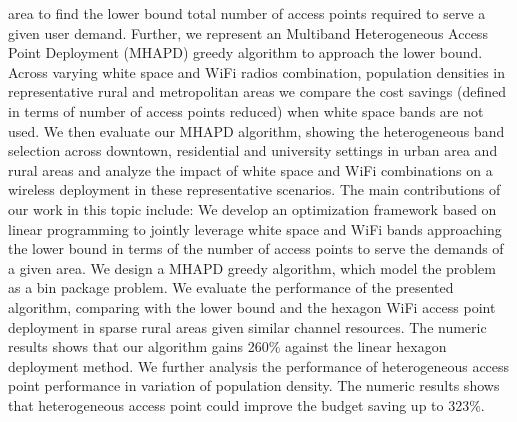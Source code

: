 area to find the lower bound total number of access points required to 
serve a given user demand. Further, we represent an Multiband Heterogeneous 
Access Point Deployment (MHAPD) greedy algorithm 
to approach the lower bound. Across varying white space and WiFi radios 
combination, population densities in representative rural and metropolitan 
areas we compare the cost savings (defined in terms of number of access 
points reduced) when white space bands are not used. We then evaluate our 
MHAPD algorithm, showing the heterogeneous band selection across downtown, 
residential and university settings in urban area and rural areas and analyze 
the impact of white space and WiFi combinations on a wireless deployment in 
these representative scenarios.
The main contributions of our work in this topic include: We develop an 
optimization framework based on linear programming to jointly leverage 
white space and WiFi bands approaching the lower bound in terms of the number 
of access points to serve the demands of a given area. We design a MHAPD 
greedy algorithm, which model the problem as a bin package problem. We 
evaluate the performance of the presented algorithm, comparing with the 
lower bound and the hexagon WiFi access point deployment in sparse rural 
areas given similar channel resources. The numeric results shows that our 
algorithm gains 260\% against the linear hexagon deployment method.  We 
further analysis the performance of heterogeneous access point performance in 
variation of population density. The numeric results shows that heterogeneous 
access point could improve the budget saving up to 323\%. 

